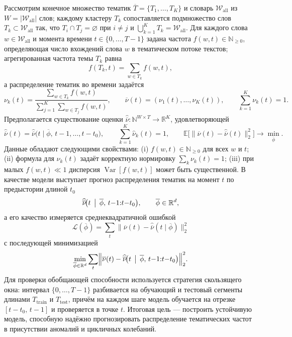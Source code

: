 \documentclass[14pt,a4paper]{article}
\begin{document}
Рассмотрим конечное множество тематик $\overline{T}=\{T_1,\dots,T_K\}$ и словарь $\mathcal{W}_{\mathrm{all}}$ из $W=|\mathcal{W}_{\mathrm{all}}|$ слов; каждому кластеру $T_k$ сопоставляется подмножество слов $T_k\subset\mathcal{W}_{\mathrm{all}}$ так, что $T_i\cap T_j=\varnothing$ при $i\neq j$ и $\bigcup_{k=1}^K T_k=\mathcal{W}_{\mathrm{all}}$. Для каждого слова $w\in\mathcal{W}_{\mathrm{all}}$ и момента времени $t\in\{0,\dots,T-1\}$ задана частота $f(w,t)\in\mathbb{N}_{\ge0}$, определяющая число вхождений слова $w$ в тематическом потоке текстов; агрегированная частота темы $T_k$ равна
\[
f(T_k,t)=\sum_{w\in T_k}f(w,t),
\]
а распределение тематик во времени задаётся
\[
\nu_k(t)=\frac{\sum_{w\in T_k}f(w,t)}{\sum_{j=1}^K\sum_{w\in T_j}f(w,t)},\qquad\overline{\nu}(t)=(\nu_1(t),\dots,\nu_K(t)),\qquad\sum_{k=1}^K\nu_k(t)=1.
\]
Предполагается существование оценки $\widehat{\overline{\nu}}\colon\mathbb{N}^{W\times T}\to\mathbb{R}^K$, удовлетворяющей
\[
\widehat{\overline{\nu}}(t)=\widehat{\overline{\nu}}\bigl(t\mid\overline{\phi},\,t-1,\dots,t-t_0\bigr),\qquad\sum_{k=1}^K\widehat{\nu}_k(t)=1,\qquad\mathbb{E}\bigl[\|\overline{\nu}(t)-\widehat{\overline{\nu}}(t)\|_2^2\bigr]\to\min_{\overline{\phi}}.
\]
Данные обладают следующими свойствами: (i) $f(w,t)\in\mathbb{N}_{\ge0}$ для всех $w$ и $t$; (ii) формула для $\nu_k(t)$ задаёт корректную нормировку $\sum_{k}\nu_k(t)=1$; (iii) при малых $f(w,t)\ll1$ дисперсия $\operatorname{Var}[f(w,t)]$ может быть существенной. В качестве модели выступает прогноз распределения тематик на момент $t$ по предыстории длиной $t_0$
\[
\widehat{\overline{\nu}}\!\bigl(t\,\bigm|\,\overline{\phi},\,t{-}1{:}t{-}t_0\bigr),\qquad\overline{\phi}\in\mathbb{R}^d,
\]
а его качество измеряется среднеквадратичной ошибкой
\[
\mathcal{L}(\overline{\phi})=\sum_{t}\bigl\|\overline{\nu}(t)-\widehat{\overline{\nu}}(t\mid\overline{\phi})\bigr\|_2^2
\]
с последующей минимизацией
\[
\min_{\overline{\phi}\in\mathbb{R}^d}\sum_{t}\Bigl\|\overline{\nu}(t)-\widehat{\overline{\nu}}\!\bigl(t\,\bigm|\,\overline{\phi},\,t{-}1{:}t{-}t_0\bigr)\Bigr\|_2^2.
\] \label{eq:classic_min}
Для проверки обобщающей способности используется стратегия скользящего окна: интервал $\{0,\dots,T-1\}$ разбивается на обучающий и тестовый сегменты длинами $T_{\mathrm{train}}$ и $T_{\mathrm{test}}$, причём на каждом шаге модель обучается на отрезке $[t{-}t_0,\,t{-}1]$ и проверяется в точке $t$. Итоговая цель — построить устойчивую модель, способную надёжно прогнозировать распределение тематических частот в присутствии аномалий и цикличных колебаний.
\end{document}
